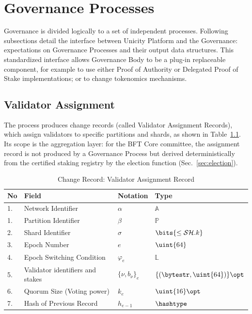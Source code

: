 \chapter{Governance Processes}

Governance is divided logically to a set of independent processes. Following subsections detail the interface between Unicity Platform and the Governance: expectations on Governance Processes and their output data structures. This standardized interface allows Governance Body to be a plug-in replaceable component, for example to use either Proof of Authority or Delegated Proof of Stake implementations; or to change tokenomics mechanisms.

\section{Validator Assignment}

The process produces change records (called Validator Assignment Records), which assign validators to specific partitions and shards, as shown in Table~\ref{ta:var}. Its scope is the aggregation layer: for the BFT Core committee, the assignment record is not produced by a Governance Process but derived deterministically from the certified staking registry by the election function (Sec.~\ref{sec:election}).

\begin{table}[!htbp]
	\begin{center}
		\caption{Change Record: Validator Assignment Record}\label{ta:var}
		\begin{tabular}{|p{0.5cm}|p{8cm}|p{1.7cm}|p{3.5cm}|}\hline
			No & Field                      & Notation      & Type                        \\\hline\hline
			1. & Network Identifier         & $\alpha$      & $\mathbb{A}$                \\\hline
			1. & Partition Identifier       & $\beta$       & $\mathbb{P}$                \\\hline
			2. & Shard Identifier           & $\sigma$      & $\bits{\le \mathcal{SH}.k}$ \\\hline
			3. & Epoch Number               & $e$           & $\uint{64}$                 \\\hline
			4. & Epoch Switching Condition  & $\varphi_e$   & $\mathbb{L}$               \\\hline
			5. & Validator identifiers and stakes& $\{\nu, b_\nu\}_e$ & $\{ (\bytestr, \uint{64}) \} \opt$ \\\hline
			6. & Quorum Size (Voting power) & $k_e$         & $\uint{16} \opt$                 \\\hline
			7. & Hash of Previous Record    & $h_{e-1}$     & $\hashtype$                \\\hline
		\end{tabular}
	\end{center}
\end{table}

